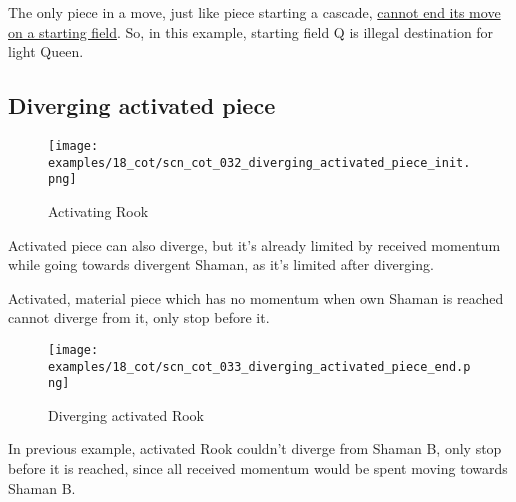 The only piece in a move, just like piece starting a cascade,
\hyperref[fig:scn_mv_46_static_move_is_illegal_init]{cannot end its move on a starting field}.
So, in this example, starting field Q is illegal destination for light Queen.

\clearpage %

\subsection*{Diverging activated piece}
\label{sec:Conquest of Tlalocan/Divergence/Diverging activated piece}

\vspace*{-1.4\baselineskip}
\noindent
\begin{figure}[!h]
\texttt{[image: examples/18\_cot/scn\_cot\_032\_diverging\_activated\_piece\_init.png]}
\vspace*{-1.3\baselineskip}
\caption{Activating Rook}
\label{fig:scn_cot_032_diverging_activated_piece_init}
\end{figure}

\vspace*{-0.4\baselineskip}
Activated piece can also diverge, but it's already limited by received momentum
while going towards divergent Shaman, as it's limited after diverging.

Activated, material piece which has no momentum when own Shaman is reached cannot
diverge from it, only stop before it.

\clearpage %

\vspace*{-2.1\baselineskip}
\noindent
\begin{figure}[!h]
\texttt{[image: examples/18\_cot/scn\_cot\_033\_diverging\_activated\_piece\_end.png]}
\vspace*{-1.3\baselineskip}
\caption{Diverging activated Rook}
\label{fig:scn_cot_033_diverging_activated_piece_end}
\end{figure}

\vspace*{-0.4\baselineskip}
In previous example, activated Rook couldn't diverge from Shaman B, only stop before
it is reached, since all received momentum would be spent moving towards Shaman B.

